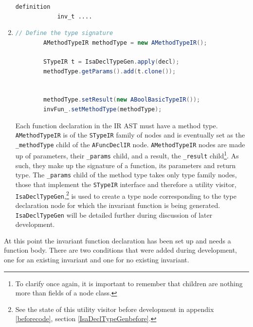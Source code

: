 \begin{enumerate}
\begin{lstlisting}[language = Isabelle]
		definition
			inv_t ....
	    \end{lstlisting}
	    \item \begin{lstlisting}[language=Java] 
		// Define the type signature
	    AMethodTypeIR methodType = new AMethodTypeIR();
	    
	    STypeIR t = IsaDeclTypeGen.apply(decl);
	    methodType.getParams().add(t.clone());
	    
	        
		methodType.setResult(new ABoolBasicTypeIR());
	    invFun_.setMethodType(methodType);
	    \end{lstlisting}
	    Each function declaration in the IR AST must have a method type. \lstinline[language=Java]{AMethodTypeIR} is of the \lstinline[language=Java]{STypeIR} family of nodes and is eventually set as the \lstinline[language=Java]{_methodType} child of the \lstinline[language=Java]{AFuncDeclIR} node. \lstinline[language=Java]{AMethodTypeIR} nodes are made up of parameters, their \lstinline[language=Java]{_params} child, and a result, the \lstinline[language=Java]{_result} child\footnote{To clarify once again, it is important to remember that children are nothing more than fields of a node class.}. As such, they make up the signature of a function, its parameters and return type. The \lstinline[language=Java]{_params} child of the method type takes only type family nodes, those that implement the \lstinline[language=Java]{STypeIR} interface and therefore a utility visitor, \lstinline[language=Java]{IsaDeclTypeGen},\footnote{See the state of this utility visitor before development in appendix \ref{beforecode}, section \ref{IsaDeclTypeGenbefore}.} is used to create a type node corresponding to the type declaration node for which the invariant function is being generated. \lstinline[language=Java]{IsaDeclTypeGen} will be detailed further during discussion of later development. 
	\end{enumerate}

	At this point the invariant function declaration has been set up and needs a function body. There are two conditions that were added during development, one for an existing invariant and one for no existing invariant.

